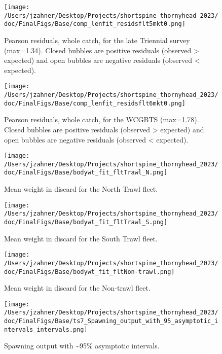 \documentclass[11pt,
  english,
  letterpaper,
]{article}
\begin{document}
\begin{figure}
\centering
\texttt{[image: /Users/jzahner/Desktop/Projects/shortspine\_thornyhead\_2023/doc/FinalFigs/Base/comp\_lenfit\_residsflt5mkt0.png]}
\caption{Pearson residuals, whole catch, for the late Triennial survey (max=1.34). Closed bubbles are positive residuals (observed \textgreater{} expected) and open bubbles are negative residuals (observed \textless{} expected).\label{fig:resids_tri2}}
\end{figure}

\begin{figure}
\centering
\texttt{[image: /Users/jzahner/Desktop/Projects/shortspine\_thornyhead\_2023/doc/FinalFigs/Base/comp\_lenfit\_residsflt6mkt0.png]}
\caption{Pearson residuals, whole catch, for the WCGBTS (max=1.78). Closed bubbles are positive residuals (observed \textgreater{} expected) and open bubbles are negative residuals (observed \textless{} expected).\label{fig:resids_wcgbts}}
\end{figure}

\begin{figure}
\centering
\texttt{[image: /Users/jzahner/Desktop/Projects/shortspine\_thornyhead\_2023/doc/FinalFigs/Base/bodywt\_fit\_fltTrawl\_N.png]}
\caption{Mean weight in discard for the North Trawl fleet.\label{fig:weightNorthTrl}}
\end{figure}

\begin{figure}
\centering
\texttt{[image: /Users/jzahner/Desktop/Projects/shortspine\_thornyhead\_2023/doc/FinalFigs/Base/bodywt\_fit\_fltTrawl\_S.png]}
\caption{Mean weight in discard for the South Trawl fleet.\label{fig:weightSouthTrl}}
\end{figure}

\begin{figure}
\centering
\texttt{[image: /Users/jzahner/Desktop/Projects/shortspine\_thornyhead\_2023/doc/FinalFigs/Base/bodywt\_fit\_fltNon-trawl.png]}
\caption{Mean weight in discard for the Non-trawl fleet.\label{fig:weightNonTrl}}
\end{figure}

\begin{figure}
\centering
\texttt{[image: /Users/jzahner/Desktop/Projects/shortspine\_thornyhead\_2023/doc/FinalFigs/Base/ts7\_Spawning\_output\_with\_95\_asymptotic\_intervals\_intervals.png]}
\caption{Spawning output with \textasciitilde95\% asymptotic intervals.\label{fig:spawnout}}
\end{figure}
\end{document}

